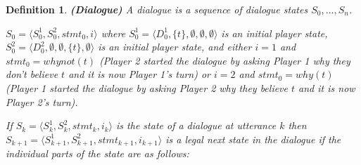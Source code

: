 \documentclass{blue-book}
\newtheorem{definition}{Definition}
\begin{document}
\begin{definition}{\bf (Dialogue)}
A dialogue is a sequence of dialogue states $S_0, \ldots, S_n$.

$S_0 = \langle S^1_0, S^2_0, stmt_0, i \rangle$ where $S^1_0 = \langle D^1_0, \{t\}, \emptyset, \emptyset, \emptyset \rangle$ is an initial player state, $S^2_0 = \langle D^2_0, \emptyset, \emptyset, \{t\}, \emptyset \rangle$ is an initial player state, and either $i = 1$ and $stmt_0 = whynot(t)$ (Player 2 started the dialogue by asking Player 1 why they don't believe $t$ and it is now Player 1's turn) or $i = 2$ and $stmt_0 = why(t)$ (Player 1 started the dialogue by asking Player 2 why they believe $t$ and it is now Player 2's turn). 

If $S_k = \langle S^1_{k}, S^2_{k}, stmt_k, i_k\rangle$ is the state of a dialogue at utterance $k$ then $S_{k+1} = \langle S^1_{k + 1}, S^2_{k + 1}, stmt_{k + 1}, i_{k + 1}\rangle$ is a legal next state in the dialogue if the individual parts of the state are as follows:

\begin{itemize}


\end{itemize}
\end{definition}
\end{document}
